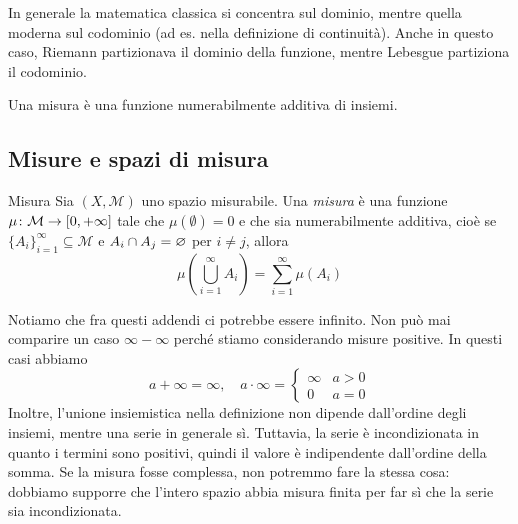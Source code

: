 \documentclass[a4paper]{article}
\begin{document}
\begin{radioactive}
In generale la matematica classica si concentra sul dominio,
mentre quella moderna sul codominio (ad es. nella definizione di continuità).
Anche in questo caso, Riemann partizionava il dominio della funzione,
mentre Lebesgue partiziona il codominio.
\end{radioactive}

\begin{radioactive}
Una misura è una funzione numerabilmente additiva di insiemi.
\end{radioactive}

\subsection{Misure e spazi di misura}

\begin{radioactive}
\begin{snippetdefinition}{Misura}
    Sia \((X, \mathcal M)\) uno spazio misurabile. Una \emph{misura}
    è una funzione \(\mu\colon\mathcal M\to[0,+\infty]\) tale che
    \(\mu(\emptyset)=0\) e che sia numerabilmente additiva, cioè se
    \(\{A_i\}_{i=1}^\infty\subseteq\mathcal M\)
    e \(A_i \cap A_j = \varnothing\) per \(i \neq j\), allora
    \[
        \mu\left(
            \bigcup_{i=1}^\infty A_i
        \right)
        = \sum_{i=1}^\infty \mu(A_i)
    \]
\end{snippetdefinition}
\end{radioactive}

\begin{radioactive}
Notiamo che fra questi addendi ci potrebbe essere infinito.
Non può mai comparire un caso \(\infty - \infty\) perché stiamo considerando misure positive.
In questi casi abbiamo \[
    a + \infty = \infty, \quad
    a \cdot \infty =
    \begin{cases}
        \infty & a>0 \\
        0 & a = 0
    \end{cases}
\]
Inoltre, l'unione insiemistica nella definizione non dipende
dall'ordine degli insiemi, mentre una serie in generale sì.
Tuttavia, la serie è incondizionata in quanto i termini sono positivi,
quindi il valore è indipendente dall'ordine della somma.
Se la misura fosse complessa, non potremmo fare la stessa cosa:
dobbiamo supporre che l'intero spazio abbia misura finita per
far sì che la serie sia incondizionata.
\end{radioactive}
\end{document}
